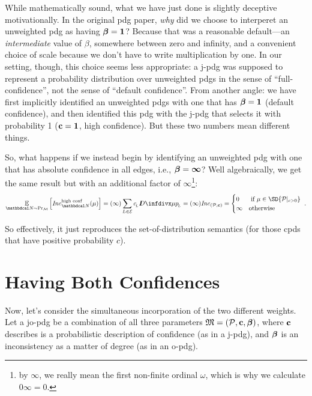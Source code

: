 \documentclass{article}
\begin{document}
While mathematically sound, what we have just done is slightly deceptive motivationally. 
In the original pdg paper, \emph{why} did we choose to interperet an unweighted pdg as having $\boldsymbol\beta = \mathbf{1}$? 
Because that was a reasonable default---an \emph{intermediate} value of $\beta$, somewhere between zero and infinity, and a convenient choice of scale because we don't have to write multiplication by one.
In our setting, though, this choice seems less appropriate: a j-pdg was supposed to represent a probability distribution over unweighted pdgs in the sense of ``full-confidence'', not the sense of ``default confidence''. 
From another angle: we have first implicitly identified an unweighted pdgs with one that has $\boldsymbol\beta = \mathbf{1}$ (default confidence), and then identified this pdg with the j-pdg that selects it with probability 1 ($\mathbf{c} = \mathbf{1}$, high confidence). 
But these two numbers mean different things. 


So, what happens if we instead begin by identifying an unweighted pdg with one that has absolute confidence in all edges, i.e., $\boldsymbol\beta = \boldsymbol\infty$?  Well algebraically, we get the same result but with an additional factor of $\infty$\footnote{by $\infty$, we really mean the first non-finite ordinal $\omega$, which is why we calculate $0 \infty = 0$.}:
\[
    \Ex_{\dg N \sim \Pr_{\mathcal M}} \left[ \Inc_{\dg N}^{\text{high conf}}(\mu) \right] 
    = (\infty) \sum_{L \in \Ed} c\ssub L  \kldiv\mu{p\ssub L}
        = (\infty) \Inc_{
            (\mathcal P, \mat c)}
        = \begin{cases}
            0 & \text{ if } \mu \in \SD{\mathcal P|_{c > 0}}\\
            \infty & \text{otherwise}\end{cases}~.
\]

So effectively, it just reproduces the set-of-distribution semantics (for those cpds that have positive probability $c$). 


\section{Having Both Confidences}
Now, let's consider the simultaneous incorporation of the two different weights.
Let a jo-pdg be a combination of all three parameters $\mathfrak M = (\mathcal P, \mathbf{c}, \boldsymbol\beta)$,
    where $\mathbf{c}$ describes is a probabilistic description of confidence (as in a j-pdg), 
    and $\boldsymbol\beta$ is an inconsistency as a matter of degree (as in an o-pdg).
\end{document}
